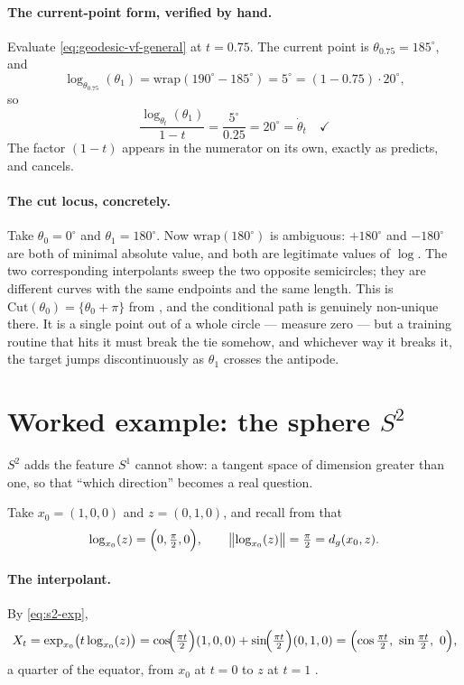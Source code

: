 \documentclass[11pt,a4paper]{report}
\theoremstyle{definition}
\theoremstyle{remark}
\begin{document}
\paragraph{The current-point form, verified by hand.} Evaluate
\eqref{eq:geodesic-vf-general} at $t=0.75$. The current point is
$\theta_{0.75}=185^\circ$, and
\[
\log_{\theta_{0.75}}(\theta_1) = \mathrm{wrap}(190^\circ-185^\circ) = 5^\circ
= (1-0.75)\cdot20^\circ ,
\]
so
\[
\frac{\log_{\theta_t}(\theta_1)}{1-t} = \frac{5^\circ}{0.25} = 20^\circ = \dot\theta_t
\quad\checkmark
\]
The factor $(1-t)$ appears in the numerator on its own, exactly as
 predicts, and cancels.

\paragraph{The cut locus, concretely.} Take $\theta_0=0^\circ$ and
$\theta_1=180^\circ$. Now $\mathrm{wrap}(180^\circ)$ is ambiguous:
$+180^\circ$ and $-180^\circ$ are both of minimal absolute value, and both
are legitimate values of $\log$. The two corresponding interpolants sweep
the two opposite semicircles; they are different curves with the same
endpoints and the same length. This is $\mathrm{Cut}(\theta_0)=\{\theta_0+\pi\}$
from , and the conditional path is genuinely
non-unique there. It is a single point out of a whole circle --- measure
zero --- but a training routine that hits it must break the tie somehow, and
whichever way it breaks it, the target jumps discontinuously as $\theta_1$
crosses the antipode.

\section{Worked example: the sphere $S^2$}
\label{sec:rfm-s2}

$S^2$ adds the feature $S^1$ cannot show: a tangent space of dimension
greater than one, so that ``which direction'' becomes a real question.

Take $x_0=(1,0,0)$ and $z=(0,1,0)$, and recall from
 that
\[
\log_{x_0}(z) = \Bigl(0,\tfrac\pi2,0\Bigr) ,
\qquad
\bigl\|\log_{x_0}(z)\bigr\| = \tfrac\pi2 = d_g(x_0,z) .
\]

\paragraph{The interpolant.} By \eqref{eq:s2-exp},
\[
X_t = \exp_{x_0}\bigl(t\log_{x_0}(z)\bigr)
= \cos\!\Bigl(\tfrac{\pi t}{2}\Bigr)(1,0,0) + \sin\!\Bigl(\tfrac{\pi t}{2}\Bigr)(0,1,0)
= \Bigl(\cos\tfrac{\pi t}2,\ \sin\tfrac{\pi t}2,\ 0\Bigr) ,
\]
a quarter of the equator, from $x_0$ at $t=0$ to $z$ at $t=1$ \checkmark.
\end{document}

